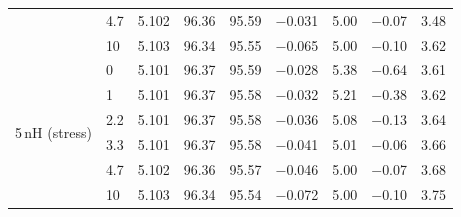 \begin{table}[p]
\begin{tabular}{@{}llrrrrrrr@{}}
 & 4.7 & 5.102 & 96.36 & 95.59 & $-$0.031 & 5.00 & $-$0.07 & 3.48 \\
 & 10 & 5.103 & 96.34 & 95.55 & $-$0.065 & 5.00 & $-$0.10 & 3.62 \\
\midrule
\multirow{6}{*}{5\,nH (stress)}  & 0 & 5.101 & 96.37 & 95.59 & $-$0.028 & 5.38 & $-$0.64 & 3.61 \\
 & 1 & 5.101 & 96.37 & 95.58 & $-$0.032 & 5.21 & $-$0.38 & 3.62 \\
 & 2.2 & 5.101 & 96.37 & 95.58 & $-$0.036 & 5.08 & $-$0.13 & 3.64 \\
 & 3.3 & 5.101 & 96.37 & 95.58 & $-$0.041 & 5.01 & $-$0.06 & 3.66 \\
 & 4.7 & 5.102 & 96.36 & 95.57 & $-$0.046 & 5.00 & $-$0.07 & 3.68 \\
 & 10 & 5.103 & 96.34 & 95.54 & $-$0.072 & 5.00 & $-$0.10 & 3.75 \\
\bottomrule
\end{tabular}\end{table}
